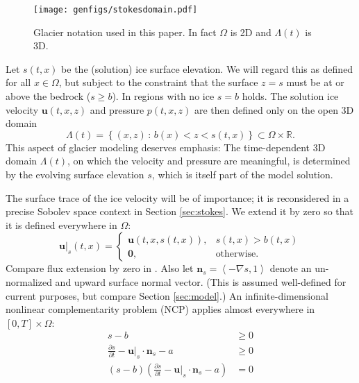 \documentclass[hidelinks,onefignum,onetabnum,final]{siamart220329}  %
\newcommand{\RR}{\mathbb{R}}
\newcommand{\grad}{\nabla}
\newcommand{\bn}{\mathbf{n}}
\newcommand{\bu}{\mathbf{u}}
\newcommand{\bzero}{\bm{0}}
\begin{document}
\begin{figure}[ht]
\centering
\texttt{[image: genfigs/stokesdomain.pdf]}
\caption{Glacier notation used in this paper.  In fact $\Omega$ is 2D and $\Lambda(t)$ is 3D.}
\label{fig:stokesdomain}
\end{figure}

Let $s(t,x)$ be the (solution) ice surface elevation.  We will regard this as defined for all $x\in\Omega$, but subject to the constraint that the surface $z=s$ must be at or above the bedrock ($s \ge b$).  In regions with no ice $s=b$ holds.  The solution ice velocity $\bu(t,x,z)$ and pressure $p(t,x,z)$ are then defined only on the open 3D domain
\begin{equation}
\Lambda(t) = \left\{(x,z)\,:\,b(x) < z < s(t,x)\right\} \subset \Omega \times \RR. \label{eq:icydomain}
\end{equation}
This aspect of glacier modeling deserves emphasis:  The time-dependent 3D domain $\Lambda(t)$, on which the velocity and pressure are meaningful, is determined by the evolving surface elevation $s$, which is itself part of the model solution.

The surface trace of the ice velocity will be of importance; it is reconsidered in a precise Sobolev space context in Section \ref{sec:stokes}.  We extend it by zero so that it is defined everywhere in $\Omega$:
\begin{equation}
\bu|_s(t,x) = \begin{cases} \bu(t,x,s(t,x)), & s(t,x)>b(t,x) \\
                            \bzero, & \text{otherwise} .\end{cases} \label{eq:defineus}
\end{equation}
Compare flux extension by zero in \cite{SchoofHewitt2013}.  Also let $\bn_s = \left<-\grad s,1\right>$ denote an un-normalized and upward surface normal vector.  (This is assumed well-defined for current purposes, but compare Section \ref{sec:model}.)  An infinite-dimensional nonlinear complementarity problem (NCP) \cite{Bueler2021conservation,FacchineiPang2003,SchoofHewitt2013} applies almost everywhere in $[0,T]\times \Omega$:
\begin{subequations}
\label{eq:ncp}
\begin{align}
s - b &\ge 0 \\
\frac{\partial s}{\partial t} - \bu|_s \cdot \bn_s - a &\ge 0 \\
(s - b) \left(\frac{\partial s}{\partial t} - \bu|_s \cdot \bn_s - a\right) &= 0
\end{align}
\end{subequations}
\end{document}
